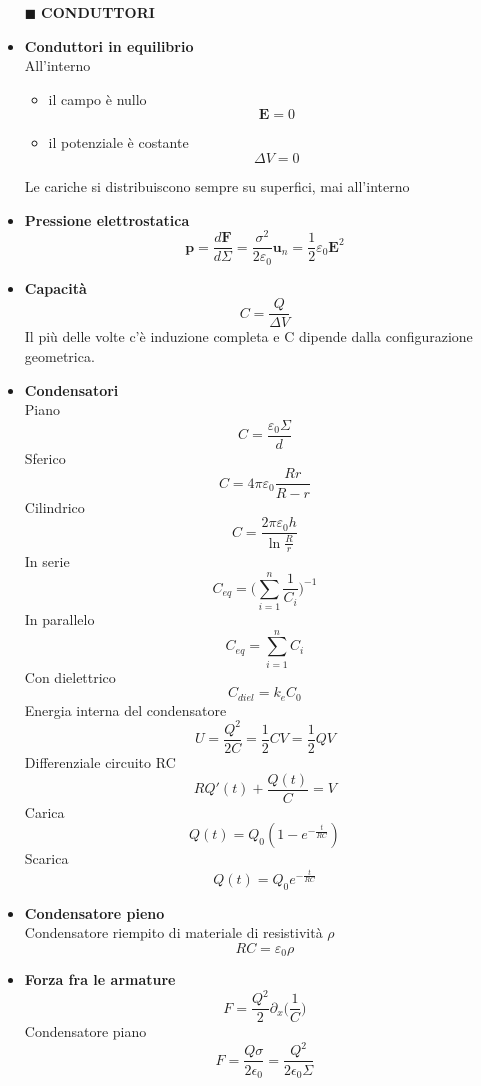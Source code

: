 \documentclass{book}
\newcommand{\g}{\textbf}
\newcommand{\h}{\mathbf}
\newcommand{\e}{\begin{equation}}
\newcommand{\ex}{\end{equation} }
\renewcommand{\it}{\item[$\cdot$]}
\begin{document}
\begin{multicols}{4}
\begin{itemize}
\item [$\blacksquare$] \g{CONDUTTORI}
    \it \g{Conduttori in equilibrio} \\
    All’interno
    \begin{itemize}
        \item il campo è nullo \e{\h{E}=0} \ex
        \item il potenziale è costante \e{\Delta V=0} \ex
    \end{itemize}
    Le cariche si distribuiscono sempre su superfici, mai all’interno
    \it \g{Pressione elettrostatica}
        \e{\h{p}=\frac{d\h{F}}{d\Sigma}=\frac{\sigma^2}{2\varepsilon_0}\h{u}_n=\frac{1}{2}\varepsilon_0 \h{E}^2} \ex
    \it \g{Capacità}
        \e{C=\frac{Q}{\Delta V}} \ex
        Il più delle volte c'è induzione completa e C dipende dalla configurazione geometrica.
    \it \g{Condensatori} \\
    Piano
        \e{C=\frac{\varepsilon_0 \Sigma}{d}} \ex
    Sferico
        \e{C=4\pi\varepsilon_0\frac{Rr}{R-r}} \ex
    Cilindrico
        \e{C=\frac{2\pi\varepsilon_0 h}{\ln \frac{R}{r}}} \ex
    In serie 
        \e{C_{eq}=\biggl( \sum_{i=1}^n \frac{1}{C_i} \biggr)^{-1}} \ex
    In parallelo
        \e{C_{eq}= \sum_{i=1}^n C_i} \ex
    Con dielettrico
        \e{C_{diel}=k_e C_0} \ex
    Energia interna del condensatore
        \e{U=\frac{Q^2}{2C}=\frac{1}{2}CV=\frac{1}{2}QV} \ex
    Differenziale circuito RC
        \e{RQ'(t)+\frac{Q(t)}{C}=V} \ex
    Carica
        \e{Q(t)=Q_0(1-e^{-\frac{t}{RC}})} \ex
    Scarica
        \e{Q(t)=Q_0 e^{-\frac{t}{RC}}} \ex
    \it \g{Condensatore pieno} \\
        Condensatore riempito di materiale di resistività $\rho$
        \e{RC=\varepsilon_0\rho} \ex
    \it \g{Forza fra le armature}
        \e{F=\frac{Q^2}{2}\partial_x \biggl(\frac{1}{C}\biggr)}\ex
        Condensatore piano
        \e{F=\frac{Q\sigma}{2\epsilon_0}=\frac{Q^2}{2\epsilon_0\Sigma}} \ex


\end{itemize}
\end{multicols}
\end{document}
